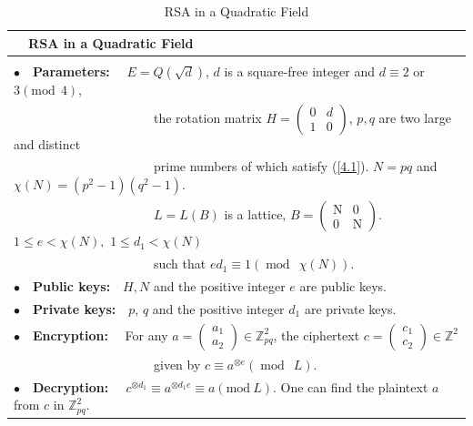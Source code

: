 \documentclass [11pt]{article}
\begin{document}
 \begin{table}[h]
\begin{tabular}{l}
\hline
  {\bf{ \ \ RSA in a  Quadratic Field  }}\\
\hline
\\
$\bullet$\ \ {\bf{Parameters:}} \ \ $ E=Q(\sqrt{d})$, $d$ is a square-free integer and $d\equiv 2$ or $3(\text{mod}\ \ 4)$,\\
\ \ \ \ \ \ \ \ \ \ \ \ \ \ \ \ \ \ \ \ \ \ the rotation matrix $H= \left(\begin{matrix}
0 & d\\
1& 0
\end{matrix}\right) $, $p,q$ are two large and distinct  \\
\ \ \ \ \ \ \ \ \ \ \ \ \ \ \ \ \ \ \ \ \ \ prime numbers of which satisfy (\ref{4.1}).  $ N=p  q$ and $\chi(N)=\left(p^{2}-1\right)\left(q^{2}-1\right).$\\
\ \ \ \ \ \ \ \ \ \ \ \ \ \ \ \ \ \ \ \ \ \
$L=L(B)$ is a lattice, $B=\left(\begin{array}{cc}\mathrm{N} & 0 \\ 0 & \mathrm{N}\end{array}\right) .$ $1 \leq e<\chi(N),$ $ 1 \leq d_{1} <\chi(N)$\\
\ \ \ \ \ \ \ \ \ \ \ \ \ \ \ \ \ \ \ \ \ \   such that $e d_{1} \equiv 1(\operatorname{mod}\ \  \chi(N))$.\\

\noindent$\bullet$\ \ {\bf{Public keys:}}\ \  $H, N$ and the positive integer $e$ are public keys.\\

 \noindent$\bullet$\ \ {\bf{Private keys:}}\ \  $p$, $q$ and the positive integer $d_{1}$ are private keys.\\

 \noindent$\bullet$\ \ {\bf{Encryption:}} \ \  For any $a=\left(\begin{array}{l}a_{1} \\ a_{2}\end{array}\right) \in \mathbb{Z}_{pq}^{2}$, the ciphertext $c=\left(\begin{array}{l} c_{1} \\ c_{2}\end{array}\right) \in \mathbb{Z}^{2}$ \\ \ \ \ \ \ \ \ \ \ \ \ \ \ \ \ \ \ \ \ \ \ \
given by $
c\equiv a^{ \otimes e} (\operatorname{mod}\ \  L).$\\
 \noindent$\bullet$\ \ {\bf{Decryption: }}\ \
 $c^{\otimes d_{1}} \equiv a^{\otimes  d_{1}e} \equiv a(\text{mod}\  L).$ One can find the plaintext $ a$ from $c$ in $\mathbb{Z}_{pq}^{2}$.\\
\hline
\end{tabular}
\caption{RSA in a  Quadratic Field}
\end{table}
\end{document}
